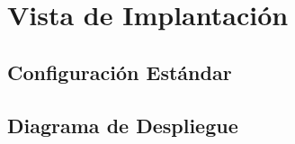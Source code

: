 \section{Vista de Implantación} \label{vistaImplantacion}
    \subsection{Configuración Estándar}
    \subsection{Diagrama de Despliegue}